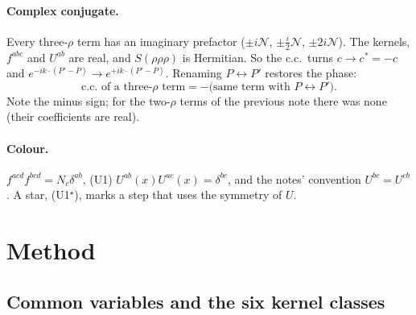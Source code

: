 \documentclass[10pt]{article}
\numberwithin{equation}{section}
\newcommand{\NN}{\mathcal N}
\begin{document}
\paragraph{Complex conjugate.} Every three-$\rho$ term has an imaginary prefactor ($\pm i\NN$, $\pm\frac i2\NN$, $\pm2i\NN$). The kernels, $f^{abc}$ and $U^{ab}$ are real, and $S(\rho\rho\rho)$ is Hermitian. So the c.c.\ turns $c\to c^*=-c$ and $e^{-ik\cdot(P'-P)}\to e^{+ik\cdot(P'-P)}$. Renaming $P\leftrightarrow P'$ restores the phase:
\begin{equation}
\text{c.c.\ of a three-$\rho$ term}=-\big(\text{same term with }P\leftrightarrow P'\big).
\label{eq:cc}
\end{equation}
Note the minus sign; for the two-$\rho$ terms of the previous note there was none (their coefficients are real).

\paragraph{Colour.} $f^{acd}f^{bcd}=N_c\delta^{ab}$, (U1) $U^{ab}(x)U^{ac}(x)=\delta^{bc}$, and the notes' convention $U^{bc}=U^{cb}$. A star, (U1$^\star$), marks a step that uses the symmetry of $U$.

\section{Method}\label{sec:method}

\subsection{Common variables and the six kernel classes}\label{sec:classes}
\end{document}
